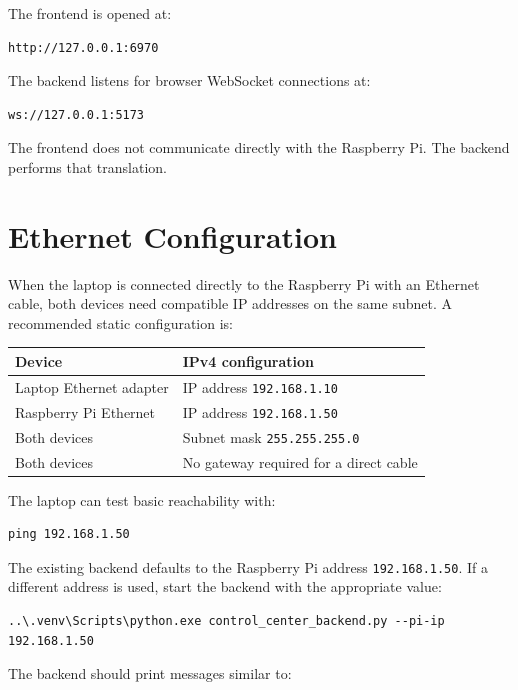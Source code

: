 \documentclass[11pt]{article}
\begin{document}
The frontend is opened at:

\begin{lstlisting}
http://127.0.0.1:6970
\end{lstlisting}

The backend listens for browser WebSocket connections at:

\begin{lstlisting}
ws://127.0.0.1:5173
\end{lstlisting}

The frontend does not communicate directly with the Raspberry Pi. The
backend performs that translation.

\section{Ethernet Configuration}

When the laptop is connected directly to the Raspberry Pi with an Ethernet
cable, both devices need compatible IP addresses on the same subnet. A
recommended static configuration is:

\begin{center}
\begin{tabular}{l l}
\toprule
Device & IPv4 configuration \\
\midrule
Laptop Ethernet adapter & IP address \texttt{192.168.1.10} \\
Raspberry Pi Ethernet & IP address \texttt{192.168.1.50} \\
Both devices & Subnet mask \texttt{255.255.255.0} \\
Both devices & No gateway required for a direct cable \\
\bottomrule
\end{tabular}
\end{center}

The laptop can test basic reachability with:

\begin{lstlisting}
ping 192.168.1.50
\end{lstlisting}

The existing backend defaults to the Raspberry Pi address
\texttt{192.168.1.50}. If a different address is used, start the backend with
the appropriate value:

\begin{lstlisting}
..\.venv\Scripts\python.exe control_center_backend.py --pi-ip 192.168.1.50
\end{lstlisting}

The backend should print messages similar to:
\end{document}
